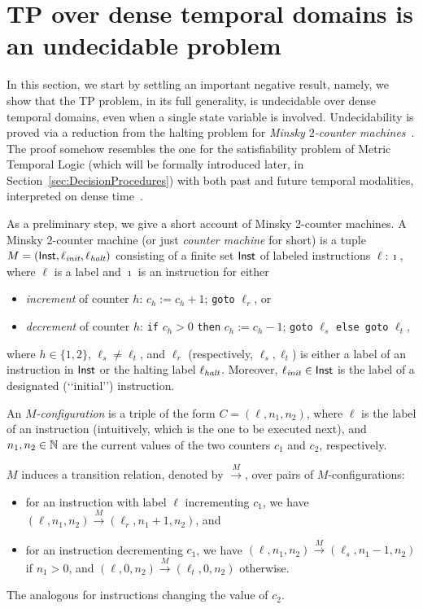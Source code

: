 \section{TP over dense temporal domains is an undecidable problem}\label{sec:undecidability}

In this section, we
start by settling an important negative result, namely, we
show that the TP problem, in its full generality, is undecidable over dense temporal domains, even when a single state variable is involved.
Undecidability is proved via a reduction from the halting problem for \emph{Minsky $2$-counter machines}~\cite{Minsky67}. The proof somehow resembles the one for the satisfiability problem of Metric Temporal Logic (which will be formally introduced later, in Section~\ref{sec:DecisionProcedures}) with both past and future temporal modalities, interpreted on dense time~\cite{AlurH93}.

As a preliminary step, we give a short account of Minsky 2-counter machines. A Minsky 2-counter machine (or just \emph{counter machine} for short) is a tuple $M = (\mathsf{Inst},\ell_{\textit{init}},\ell_{\textit{halt}})$ consisting of a finite set $\mathsf{Inst}$ of labeled instructions $\ell: \imath$, where $\ell$ is a label  and $\imath$ is an instruction for either
\begin{itemize}
  \item \emph{increment} of counter $h$: $c_h:= c_h+1$; \texttt{goto} $\ell_r$, or
  \item  \emph{decrement} of counter $h$: \texttt{if} $c_h\!>\!0$ \texttt{then} $c_h:= c_h-1$; \texttt{goto} $\ell_s$ \texttt{else goto} $\ell_t$,
\end{itemize}
where $h \in \{1, 2\}$,  $\ell_s\neq \ell_t$, and $\ell_r$ (respectively, $\ell_s, \ell_t$) is either a label of an instruction in $\mathsf{Inst}$ or the halting label $\ell_{\textit{halt}}$. Moreover, $\ell_{\textit{init}}\in\mathsf{Inst}$ is the label of a designated (\lq\lq initial\rq\rq) instruction.

An \emph{$M$-configuration} is a triple of the form $C=(\ell, n_1, n_2)$, where $\ell$ is the label of an instruction (intuitively, which is the one to be executed next), and $n_1,n_2\in\mathbb{N}$ are the current values of the two counters $c_1$ and $c_2$, respectively. 

$M$ induces a transition relation, denoted by $\stackrel{M}{\longrightarrow}$, over pairs of $M$-configurations: 
\begin{itemize}
    \item for an instruction with label $\ell$ incrementing $c_1$, we have $(\ell, n_1, n_2)\stackrel{M}{\longrightarrow} (\ell_r, n_1+1, n_2)$, and
    \item for an instruction decrementing $c_1$, we have $(\ell, n_1, n_2)\stackrel{M}{\longrightarrow} (\ell_s, n_1-1, n_2)$ if $n_1>0$, and $(\ell, 0, n_2)\stackrel{M}{\longrightarrow} (\ell_t, 0, n_2)$ otherwise. 
\end{itemize}
The analogous for instructions changing the value of $c_2$.

